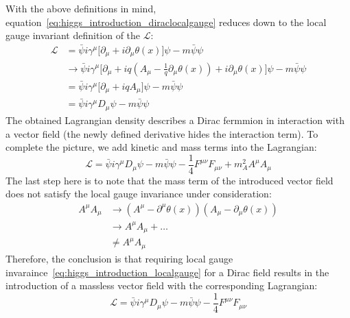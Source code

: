With the above definitions in mind, equation~\ref{eq:higgs_introduction_diraclocalgauge} reduces down to the local gauge invariant definition of the $\mathcal{L}$:
\begin{equation}\label{eq:higgs_introduction_diraclocalgauge}
    \begin{split}
    \mathcal{L}& = \bar{\psi}i\gamma^{\mu} \lbrack \partial_{\mu} + i\partial_{\mu}\theta(x) \rbrack \psi - m\bar{\psi}\psi\\
    & \rightarrow \bar{\psi}i\gamma^{\mu} \lbrack \partial_{\mu} + iq(A_{\mu} - \frac{1}{q}\partial_{\mu}\theta(x)) + i\partial_{\mu}\theta(x) \rbrack \psi - m\bar{\psi}\psi\\
    & = \bar{\psi}i\gamma^{\mu} \lbrack \partial_{\mu} + iqA_{\mu} \rbrack \psi - m\bar{\psi}\psi\\
    & = \bar{\psi}i\gamma^{\mu}D_{\mu}\psi - m\bar{\psi}\psi
    \end{split}
\end{equation}
The obtained Lagrangian density describes a Dirac fermmion in interaction with a vector field (the newly defined derivative hides the interaction term). To complete the picture, we add kinetic and mass terms into the \label{eq:higgs_introduction_diraclocalgauge} Lagrangian:
\begin{equation}
    \label{eq:higgs_introduction_diracLagrangianwithvectormass}
    \mathcal{L} = \bar{\psi}i\gamma^{\mu}D_{\mu}\psi - m\bar{\psi}\psi - \frac{1}{4}F^{\mu\nu}F_{\mu\nu} + m_{A}^{2}A^{\mu}A_{\mu}
\end{equation}
The last step here is to note that the mass term of the introduced vector field does not satisfy the local gauge invariance under consideration:
\begin{equation}\label{eq:higgs_introduction_vectorfieldmassterm}
    \begin{split}
    A^{\mu}A_{\mu}& \rightarrow (A^{\mu} - \partial^{\mu}\theta(x))(A_{\mu} - \partial_{\mu}\theta(x))\\
    & \rightarrow A^{\mu}A_{\mu} + \hdots\\
    & \neq A^{\mu}A_{\mu}
    \end{split}
\end{equation}
Therefore, the conclusion is that requiring local gauge invaraince~\ref{eq:higgs_introduction_localgauge} for a Dirac field results in the introduction of a massless vector field with the corresponding Lagrangian:
\begin{equation}
    \label{eq:higgs_introduction_diracLagrangianwithoutvectormass}
    \mathcal{L} = \bar{\psi}i\gamma^{\mu}D_{\mu}\psi - m\bar{\psi}\psi - \frac{1}{4}F^{\mu\nu}F_{\mu\nu}
\end{equation}
